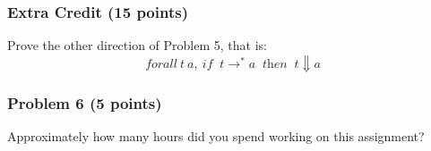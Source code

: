 \documentclass{article}
\begin{document}
\subsubsection*{Extra Credit (15 points)}

Prove the other direction of Problem 5, that is:
    \[ \textit{forall}\ t\ a,
       \ \textit{if}\;\;t \longrightarrow^* a\;\;\textit{then}\;\;t \Downarrow a 
    \]

\subsubsection*{Problem 6 (5 points)}

Approximately how many hours did you spend working on this assignment?
\end{document}
